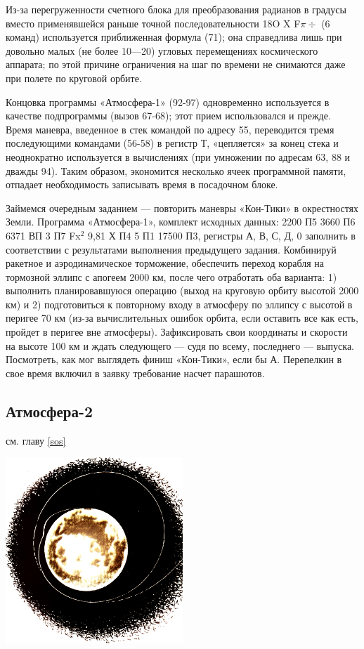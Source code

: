 \documentclass[11pt,a4paper,oneside]{article}
\begin{document}
Из-за перегруженности счетного блока для преобразования радианов в градусы вместо применявшейся раньше точной последовательности 18O X F$\pi\div$ (6 команд) используется приближенная формула (71); она справедлива лишь при довольно малых (не более 10—20\degree) угловых перемещениях космического аппарата; по этой причине ограничения на шаг по времени не снимаются даже при полете по круговой орбите.

Концовка программы «Атмосфера-1» (92-97) одновременно используется в качестве подпрограммы (вызов 67-68); этот прием использовался и прежде. Время маневра, введенное в стек командой по адресу 55, переводится тремя последующими командами (56-58) в регистр Т, «цепляется» за конец стека и неоднократно используется в вычислениях (при умножении по адресам 63, 88 и дважды 94). Таким образом, экономится несколько ячеек программной памяти, отпадает необходимость записывать время в посадочном блоке.

Займемся очередным заданием — повторить маневры «Кон-Тики» в окрестностях Земли. Программа «Атмосфера-1», комплект исходных данных: 2200 П5 3660 П6 6371 ВП 3 П7 Fx$^{2}$ 9,81 Х П4 5 П1 17500 П3, регистры А, В, С, Д, 0 заполнить в соответствии с результатами выполнения предыдущего задания. Комбинируй ракетное и аэродинамическое торможение, обеспечить переход корабля на тормозной эллипс с апогеем 2000 км, после чего отработать оба варианта: 1) выполнить планировавшуюся операцию (выход на круговую орбиту высотой 2000 км) и 2) подготовиться к повторному входу в атмосферу по эллипсу с высотой в перигее 70 км (из-за вычислительных ошибок орбита, если оставить все как есть, пройдет в перигее вне атмосферы). Зафиксировать свои координаты и скорости на высоте 100 км и ждать следующего — судя по всему, последнего — выпуска. Посмотреть, как мог выглядеть финиш «Кон-Тики», если бы А. Перепелкин в свое время включил в заявку требование насчет парашютов.

\subsection{Атмосфера-2}

см. главу \ref{sos}

\includegraphics[width=0.5\textwidth]{sos3}
\end{document}
